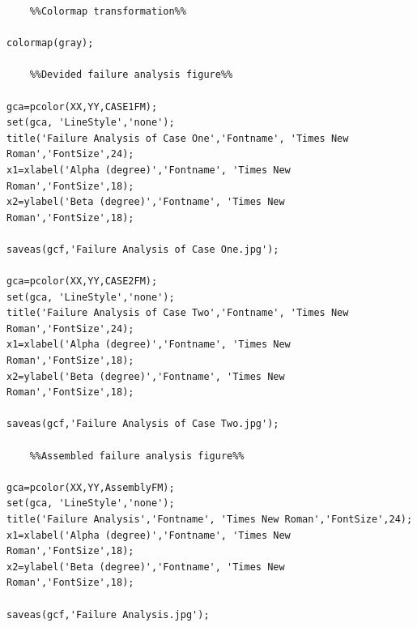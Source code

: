 \documentclass[12pt]{article}
\begin{document}
\begin{lstlisting}
	%%Colormap transformation%%

colormap(gray);

	%%Devided failure analysis figure%%

gca=pcolor(XX,YY,CASE1FM);
set(gca, 'LineStyle','none');
title('Failure Analysis of Case One','Fontname', 'Times New Roman','FontSize',24);
x1=xlabel('Alpha (degree)','Fontname', 'Times New Roman','FontSize',18);
x2=ylabel('Beta (degree)','Fontname', 'Times New Roman','FontSize',18);

saveas(gcf,'Failure Analysis of Case One.jpg');

gca=pcolor(XX,YY,CASE2FM);
set(gca, 'LineStyle','none');
title('Failure Analysis of Case Two','Fontname', 'Times New Roman','FontSize',24);
x1=xlabel('Alpha (degree)','Fontname', 'Times New Roman','FontSize',18);
x2=ylabel('Beta (degree)','Fontname', 'Times New Roman','FontSize',18);

saveas(gcf,'Failure Analysis of Case Two.jpg');

	%%Assembled failure analysis figure%%

gca=pcolor(XX,YY,AssemblyFM);
set(gca, 'LineStyle','none');
title('Failure Analysis','Fontname', 'Times New Roman','FontSize',24);
x1=xlabel('Alpha (degree)','Fontname', 'Times New Roman','FontSize',18);
x2=ylabel('Beta (degree)','Fontname', 'Times New Roman','FontSize',18);

saveas(gcf,'Failure Analysis.jpg');
	\end{lstlisting}
\end{document}
